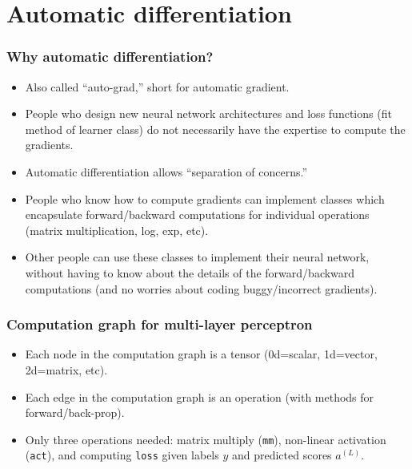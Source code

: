 \documentclass{beamer}
\begin{document}
\section{Automatic differentiation}

\begin{frame}
  \frametitle{Why automatic differentiation?}
  \begin{itemize}
  \item Also called ``auto-grad,'' short for automatic gradient.
  \item People who design new neural network architectures and loss
    functions (fit method of learner class) do not necessarily have
    the expertise to compute the gradients.
  \item Automatic differentiation allows ``separation of concerns.''
  \item People who know how to compute gradients can implement classes
    which encapsulate forward/backward computations for individual
    operations (matrix multiplication, log, exp, etc).
  \item Other people can use these classes to implement their neural
    network, without having to know about the details of the
    forward/backward computations (and no worries about coding
    buggy/incorrect gradients).
  \end{itemize}
\end{frame}

\begin{frame}
  \frametitle{Computation graph for multi-layer perceptron}
  \begin{itemize}
  \item Each node in the computation graph is a tensor (0d=scalar,
    1d=vector, 2d=matrix, etc).
  \item Each edge in the computation graph is an operation (with
    methods for forward/back-prop).
  \item Only three operations needed: matrix multiply (\texttt{mm}),
    non-linear activation (\texttt{act}), and computing \texttt{loss} given
    labels $y$ and predicted scores $a^{(L)}$.
  \end{itemize}


\end{frame}
\end{document}
